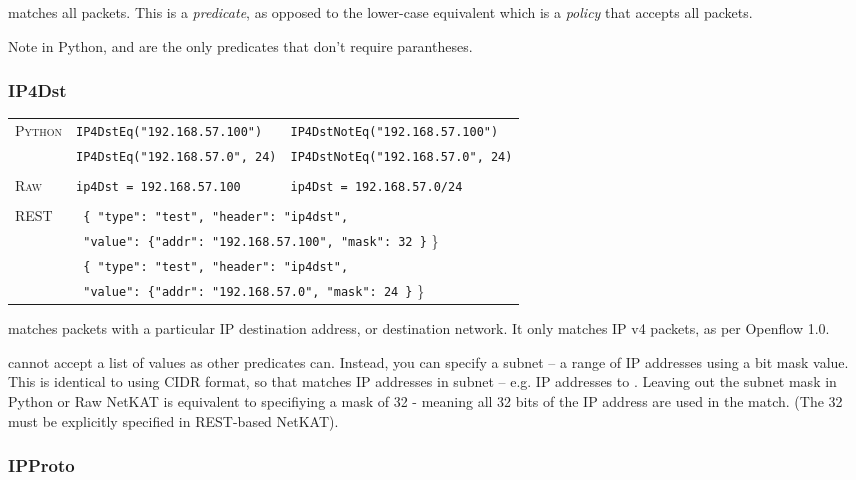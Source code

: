  matches all packets.  This is a \emph{predicate}, as opposed to the lower-case 
equivalent  
which is a \emph{policy} that accepts all packets. 

Note in Python,  and  are the only predicates that don't require parantheses.

\subsubsection{IP4Dst}

\bigskip
\begin{tabularx}{\linewidth}{lXX}
\textsc{Python}   & \texttt{IP4DstEq("192.168.57.100")}    & \texttt{IP4DstNotEq("192.168.57.100")} \\
    & \texttt{IP4DstEq("192.168.57.0", 24)}  & \texttt{IP4DstNotEq("192.168.57.0", 24)} \\ \\
\textsc{Raw}    & \texttt{ip4Dst = 192.168.57.100}     & \texttt{ip4Dst = 192.168.57.0/24} \\ \\
\textsc{REST} & \multicolumn{2}{l}{\texttt{ \{ "type": "test", "header": "ip4dst",}} \\
   & \multicolumn{2}{l}{\texttt{  "value": \{"addr": "192.168.57.100", "mask": 32 \}} \}} \\
   & \multicolumn{2}{l}{\texttt{ \{ "type": "test", "header": "ip4dst",}} \\
   & \multicolumn{2}{l}{\texttt{  "value": \{"addr": "192.168.57.0", "mask": 24 \}} \}} \\
\end{tabularx}

 matches packets with a particular IP destination address, or destination network.  It only matches
IP v4 packets, as per Openflow 1.0.  

 cannot accept a list of values as other predicates can.  
Instead, you can specify a subnet -- a range
of IP addresses using a bit mask value.  This is identical to using CIDR format, so that 
 matches IP addresses in subnet  -- e.g. 
IP addresses  to .  Leaving out the subnet mask in Python 
or Raw NetKAT is equivalent to specifiying a mask of 32 - meaning all 32 bits of the IP address are used
in the match.  (The 32 must be explicitly specified in REST-based NetKAT).

\subsubsection{IPProto}

